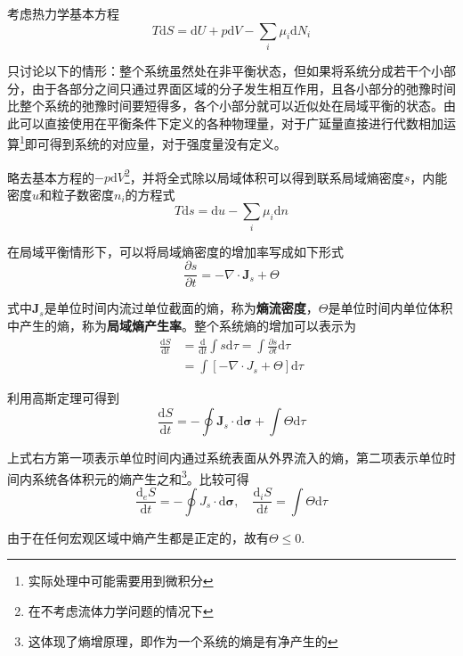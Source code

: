 \documentclass[UTF8]{ctexart}
\newcommand{\dif}{\mathrm{d}}
\begin{document}
	考虑热力学基本方程
	\begin{equation}
	T \mathrm{d} S=\mathrm{d} U+p \mathrm{d} V-\sum_{i} \mu_{i} \mathrm{d} N_{i}
	\end{equation}
	
\noindent 只讨论以下的情形：整个系统虽然处在非平衡状态，但如果将系统分成若干个小部分，由于各部分之间只通过界面区域的分子发生相互作用，且各小部分的弛豫时间比整个系统的弛豫时间要短得多，各个小部分就可以近似处在局域平衡的状态。由此可以直接使用在平衡条件下定义的各种物理量，对于广延量直接进行代数相加运算\footnote{实际处理中可能需要用到微积分}即可得到系统的对应量，对于强度量没有定义。

	略去基本方程的$ -p \dif V $\footnote{在不考虑流体力学问题的情况下}，并将全式除以局域体积可以得到联系局域熵密度$ s $，内能密度$ u $和粒子数密度$ n_{i} $的方程式
	\begin{equation}
	T \mathrm{d} s=\mathrm{d} u-\sum_{i} \mu_{i} \mathrm{d} n
	\end{equation}
	
	在局域平衡情形下，可以将局域熵密度的增加率写成如下形式
	\begin{equation}
	\frac{\partial s}{\partial t}=-\nabla \cdot \boldsymbol{J}_{s}+\Theta
	\end{equation}
	
\noindent 式中$ \boldsymbol{J}_{s} $是单位时间内流过单位截面的熵，称为\textbf{熵流密度}，$ \Theta $是单位时间内单位体积中产生的熵，称为\textbf{局域熵产生率}。整个系统熵的增加可以表示为
\begin{equation}
\begin{aligned} \frac{\mathrm{d} S}{\mathrm{d} t} &=\frac{\mathrm{d}}{\mathrm{d} t} \int s \mathrm{d} \tau=\int \frac{\partial s}{\partial t} \mathrm{d} \tau \\ &=\int\left[-\nabla \cdot J_{s}+\Theta\right] \mathrm{d} \tau \end{aligned}
\end{equation}

\noindent 利用高斯定理可得到
\begin{equation}
\frac{\mathrm{d} S}{\mathrm{d} t}=-\oint \boldsymbol{J}_{s} \cdot \mathrm{d} \boldsymbol{\sigma}+\int \Theta \mathrm{d} \tau
\end{equation}

\noindent 上式右方第一项表示单位时间内通过系统表面从外界流入的熵，第二项表示单位时间内系统各体积元的熵产生之和\footnote{这体现了熵增原理，即作为一个系统的熵是有净产生的}。比较可得
\begin{equation}
\frac{\mathrm{d}_{e} S}{\mathrm{d} t}=-\oint J_{s} \cdot \mathrm{d} \boldsymbol{\sigma}, \quad \frac{\mathrm{d}_{i} S}{\mathrm{d} t}=\int \Theta \mathrm{d} \tau
\end{equation}

\noindent 由于在任何宏观区域中熵产生都是正定的，故有$ \Theta \leq 0 $.
\end{document}
